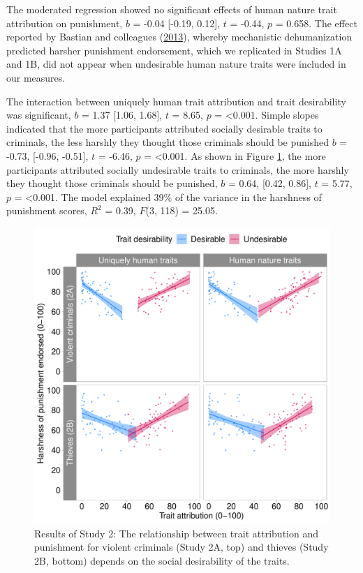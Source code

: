 \documentclass[
]{article}
\begin{document}
The moderated regression showed no significant effects of human nature trait attribution on punishment, \(b\) = -0.04 {[}-0.19, 0.12{]}, \(t\) = -0.44, \(p\) = 0.658. The effect reported by Bastian and colleagues (\protect\hyperlink{ref-Bastian2013}{2013}), whereby mechanistic dehumanization predicted harsher punishment endorsement, which we replicated in Studies 1A and 1B, did not appear when undesirable human nature traits were included in our measures.

The interaction between uniquely human trait attribution and trait desirability was significant, \(b\) = 1.37 {[}1.06, 1.68{]}, \(t\) = 8.65, \(p\) = \textless0.001. Simple slopes indicated that the more participants attributed socially desirable traits to criminals, the less harshly they thought those criminals should be punished \(b\) = -0.73, {[}-0.96, -0.51{]}, \(t\) = -6.46, \(p\) = \textless0.001. As shown in Figure \ref{fig:figure2}, the more participants attributed socially undesirable traits to criminals, the more harshly they thought those criminals should be punished, \(b\) = 0.64, {[}0.42, 0.86{]}, \(t\) = 5.77, \(p\) = \textless0.001. The model explained 39\% of the variance in the harshness of punishment scores, \(R^2\) = 0.39, \(F\)(3, 118) = 25.05.

\begin{figure}

{\centering \includegraphics{figures/plot2} 

}

\caption{Results of Study 2: The relationship between trait attribution and punishment for violent criminals (Study 2A, top) and thieves (Study 2B, bottom) depends on the social desirability of the traits.}\label{fig:figure2}
\end{figure}
\end{document}
